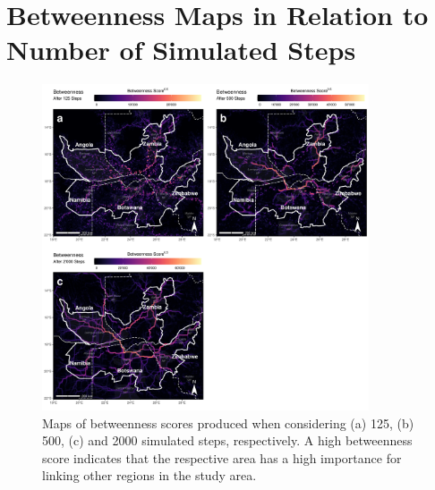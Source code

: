 \documentclass[abstract=off,10pt,a4paper,bibliography=totocnumbered]{article}
\begin{document}
\section{Betweenness Maps in Relation to Number of Simulated Steps}
\begin{figure}[hbtp]
  \begin{center}
    \includegraphics[width = 0.86\textwidth]{99_BetweennessIndividual.png}
    \caption{Maps of betweenness scores produced when considering (a) 125, (b)
    500, (c) and 2000 simulated steps, respectively. A high betweenness score
    indicates that the respective area has a high importance for linking other
    regions in the study area.}
    \label{Betweenness}
  \end{center}
\end{figure}
\restoregeometry

\newpage
\begingroup
\singlespacing

\endgroup
\end{document}
